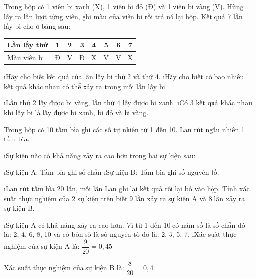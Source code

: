 \begin{bt}
	Trong hộp có 1 viên bi xanh (X), 1 viên bi đỏ (Đ) và 1 viên bi vàng (V). Hùng lấy ra lần lượt từng viên, ghi màu của viên bi rồi trả nó lại hộp. Kết quả 7 lần lấy bi cho ở bảng sau:
	\begin{center}
		\begin{tabular}{|l|c|c|c|c|c|c|c|}
			\hline
			Lần lấy thứ	&1&	2&	3&	4&	5&	6&	7\\
			\hline
			Màu viên bi&	Đ&	V&	Đ&	X&	V&	V&	X\\
			\hline
		\end{tabular}
	\end{center}
	\begin{enumerate}[a),leftmargin=*]
		\i Hãy cho biết kết quả của lần lấy bi thứ 2 và thứ 4.                                                                
		\i Hãy cho biết có bao nhiêu kết quả khác nhau có thể xảy ra trong mỗi lần lấy bi.
	\end{enumerate}        
	\begin{loigiaichuong42}
		\begin{enumerate}[a),leftmargin=*]
			\i Lần thứ 2 lấy được bi vàng, lần thứ 4 lấy được bi xanh.
			\i Có 3 kết quả khác nhau khi lấy bi là lấy được bi xanh, bi đỏ và bi vàng.
		\end{enumerate}
	\end{loigiaichuong42}
\end{bt}           
\begin{bt}
	Trong hộp có 10 tấm bìa ghi các số tự nhiên từ 1 đến 10. Lan rút ngẫu nhiên 1 tấm bìa.
	\begin{enumerate}[a),leftmargin=*]
		\i Sự kiện nào có khả năng xảy ra cao hơn trong hai sự kiện sau:
		\begin{enumerate}[+,leftmargin=*]
			\i Sự kiện A: Tấm bỉa ghi số chẵn
			\i Sự kiện B: Tấm bìa ghi số nguyên tố.
		\end{enumerate}
		\i Lan rút tấm bìa 20 lần, mỗi lần Lan ghi lại kết quả rồi lại bỏ vào hộp. Tính xác suất thực nghiệm của 2 sự kiện trên biết 9 lần xảy ra sự kiện A và 8 lần xảy ra sự kiện B. 
	\end{enumerate}
	\begin{loigiaichuong42}
		\begin{enumerate}[a),leftmargin=*]
			\i Sự kiện A có khả năng xảy ra cao hơn. Vì từ 1 đến 10 có năm số là số chẵn đó là: 2, 4, 6, 8, 10 và có bốn số là số nguyên tố đó là: 2, 3, 5, 7.
			\i Xác suất thực nghiệm của sự kiện A là: $\dfrac{9}{{20}} = 0,45$ 
			
			Xác suất thực nghiệm của sự kiện B là:  $\dfrac{8}{{20}} = 0,4$
		\end{enumerate}
	\end{loigiaichuong42}
\end{bt}
